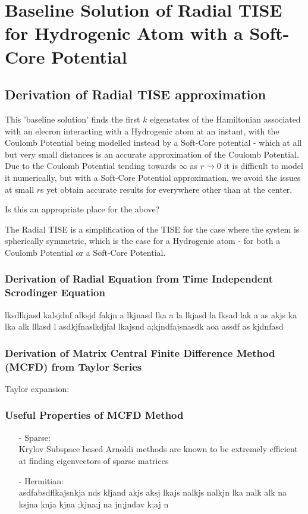 
\chapter{Baseline Solution of Radial TISE for Hydrogenic Atom with a Soft-Core Potential} %

\label{Chapter2} %



\section{Derivation of Radial TISE approximation}
This 'baseline solution' finds the first $k$ eigenstates of the Hamiltonian associated with an elecron interacting with a Hydrogenic atom at an instant, with the Coulomb Potential being modelled instead by a Soft-Core potential - which at all but very small distances is an accurate approximation of the Coulomb Potential. Due to the Coulomb Potential tending towards $\infty$ as $r\rightarrow 0$ it is difficult to model it numerically, but with a Soft-Core Potential approximation, we avoid the issues at small $r$s yet obtain accurate results for everywhere other than at the center.

Is this an appropriate place for the above?

The Radial TISE is a simplification of the TISE for the case where the system is spherically symmetric, which is the case for a Hydrogenic atom - for both a Coulomb Potential or a Soft-Core Potential.

\subsection{Derivation of Radial Equation from Time Independent Scrodinger Equation}
lksdlkjasd kalsjdnf alksjd fakjn a lkjnasd lka a la lkjasd la lksad lak a
as akjs ka lka alk lllasd l
asdkjfnaslkdjfal lkajsnd a;kjndfajsnasdk aoa 
assdf as kjdnfasd

\subsection{Derivation of Matrix Central Finite Difference Method (MCFD) from Taylor Series}
Taylor expansion: 


\subsection{Useful Properties of MCFD Method}
\begin{itemize}
\item[-]Sparse: \\ Krylov Subspace based Arnoldi methods are known to be extremely efficient at finding eigenvectors of sparse matrices
\item[-]Hermitian: \\ asdfabsdflkajsnkja nds kljand akjs aksj lkajs nalkjs nalkjn  lka nalk  alk na ksjna knja kjna ;kjna;j na jn;jndav k;aj n
\end{itemize}

